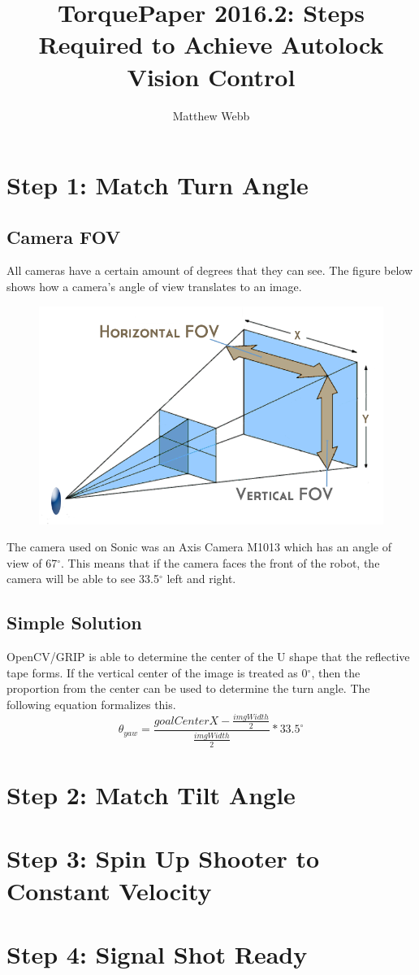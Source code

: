 \documentclass[a4paper,12pt]{report}
\author{Matthew Webb}
\title{TorquePaper 2016.2: Steps Required to Achieve Autolock Vision Control}
\newcommand{\tab}{\hspace{20pt}}
\begin{document}
	\maketitle
	\tableofcontents
	
	\chapter{Step 1: Match Turn Angle}
	\section{Camera FOV}
	\tab All cameras have a certain amount of degrees that they can see. The figure below shows how a camera's angle of view translates to an image.
	
	\begin{figure}[h]
		\centering
		\includegraphics[scale=.3]{camerafov.png}
	\end{figure}
	
	\tab The camera used on Sonic was an Axis Camera M1013 which has an angle of view of 67$^{\circ}$. This means that if the camera faces the front of the robot, the camera will be able to see 33.5$^{\circ}$ left and right.
	\section{Simple Solution}
	\tab OpenCV/GRIP is able to determine the center of the U shape that the reflective tape forms. If the vertical center of the image is treated as 0$^{\circ}$, then the proportion from the center can be used to determine the turn angle. The following equation formalizes this.
	\[\theta_{yaw} = \frac{goalCenterX - \frac{imgWidth}{2}}{\frac{imgWidth}{2}} * 33.5^{\circ}\]
	
	\chapter{Step 2: Match Tilt Angle}
	
	\chapter{Step 3: Spin Up Shooter to Constant Velocity}
	
	\chapter{Step 4: Signal Shot Ready}
\end{document}
